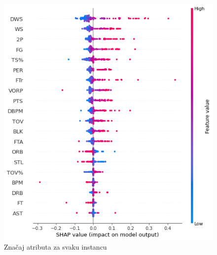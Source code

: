 \documentclass[a4paper]{article}
\begin{document}
\begin{figure}[h!]
\begin{center}
\includegraphics[scale=0.4]{shap_simple_1.png}
\end{center}
\caption{Značaj atributa za svaku instancu}
\label{plt:shap_simple_1}
\end{figure}
\end{document}
